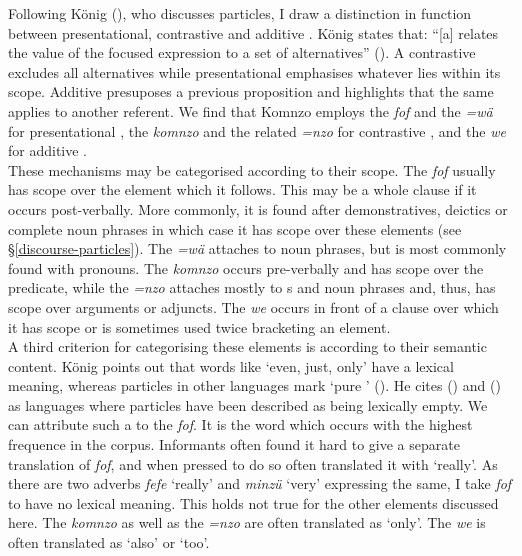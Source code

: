 Following König (\citeyear{Konig:1991vy}), who discusses  particles, I draw a distinction in function between presentational, contrastive and additive . König states that: ``[a]   relates the value of the focused expression to a set of alternatives'' (\citeyear[32]{Konig:1991vy}). A contrastive  excludes all alternatives while presentational  emphasises whatever lies within its scope. Additive  presuposes a previous proposition and highlights that the same applies to another referent. We find that Komnzo employs the  \emph{fof} and the  \emph{=wä} for presentational , the  \emph{komnzo} and the related  \emph{=nzo} for contrastive , and the  \emph{we} for additive .\\

These mechanisms may be categorised according to their scope. The  \emph{fof} usually has scope over the element which it follows. This may be a whole clause if it occurs post-verbally. More commonly, it is found after demonstratives, deictics or complete noun phrases in which case it has scope over these elements (see \S{}\ref{discourse-particles}). The  \emph{=wä} attaches to noun phrases, but is most commonly found with pronouns. The  \emph{komnzo} occurs pre-verbally and has scope over the predicate, while the  \emph{=nzo} attaches mostly to s and noun phrases and, thus, has scope over arguments or adjuncts. The  \emph{we} occurs in front of a clause over which it has scope or is sometimes used twice bracketing an element.\\

A third criterion for categorising these elements is according to their semantic content. König points out that  words like `even, just, only' have a lexical meaning, whereas  particles in other languages mark `pure ' (\citeyear[29ff.]{Konig:1991vy}). He cites  (\citealt[21ff.]{Saeed:1984wm}) and  (\citealt[476ff.]{Lichtenberk:1983vh}) as languages where  particles have been described as being lexically empty. We can attribute such a  to the  \emph{fof}. It is the word which occurs with the highest frequence in the corpus. Informants often found it hard to give a separate translation of \emph{fof}, and when pressed to do so often translated it with `really'. As there are two adverbs \emph{fefe} `really' and \emph{minzü} `very' expressing the same, I take \emph{fof} to have no lexical meaning. This holds not true for the other elements discussed here. The  \emph{komnzo} as well as the  \emph{=nzo} are often translated as `only'. The  \emph{we} is often translated as `also' or `too'.\\

